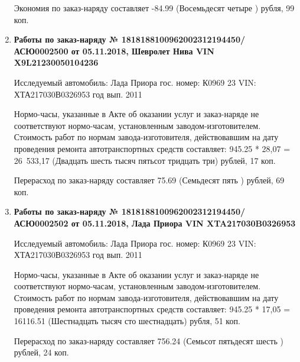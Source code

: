 \begin{enumerate}
Экономия по заказ-наряду составляет -84.99 (Восемьдесят четыре ) рубля, 99 коп.  
\vspace{3mm}







\item \par\textbf{{Работы по заказ-наряду   № 1818188100962002312194450/\-АСЮ0002500 от 05.11.2018, Шевролет Нива  VIN  X9L21230050104236}}

Исследуемый автомобиль:  Лада Приора гос. номер: К0969 23 VIN: ХТА217030В0326953 год вып. 2011



Нормо-часы, указанные в Акте об оказании услуг и заказ-наряде не соответствуют нормо-часам,  установленным заводом-изготовителем.\\
Стоимость работ по нормам завода-изготовителя, действовавшим на дату проведения ремонта автотранспортных средств составляет: 945.25 * 28,07 = 26 533,17
 (Двадцать шесть тысяч пятьсот тридцать три) рублей, 17 коп.

Перерасход по заказ-наряду составляет 75.69 (Семьдесят пять ) рублей, 69 коп.  
\vspace{3mm}






\item \par\textbf{{Работы по заказ-наряду   № 1818188100962002312194450/\-АСЮ0002502 от 05.11.2018, Лада Приора VIN XTA217030B0326953}}

Исследуемый автомобиль:  Лада Приора гос. номер: К0969 23 VIN: ХТА217030В0326953 год вып. 2011





Нормо-часы, указанные в Акте об оказании услуг и заказ-наряде не соответствуют нормо-часам,  установленным заводом-изготовителем.\\
Стоимость работ по нормам завода-изготовителя, действовавшим на дату проведения ремонта автотранспортных средств составляет: 945.25 * 17,05 = 16116.51 (Шестнадцать тысяч сто шестнадцать) рубля, 51 коп.

Перерасход по заказ-наряду составляет 756.24 (Семьсот пятьдесят шесть ) рублей, 24 коп.  
\vspace{3mm}







\end{enumerate}
